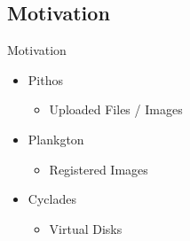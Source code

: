 \documentclass[utf8]{beamer}
\begin{document}
\subsection{Motivation}

\begin{frame}{Motivation}
  \begin{itemize}
  \item Pithos
    \begin{itemize}
      \item Uploaded Files / Images
    \end{itemize}
  \item Plankgton
    \begin{itemize}
      \item Registered Images
    \end{itemize}
  \item Cyclades
    \begin{itemize}
      \item Virtual Disks
    \end{itemize}      
  \end{itemize}
\end{frame}
\end{document}
